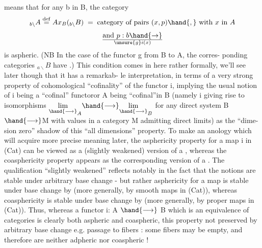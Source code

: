 means that for any b in B, the category
\[ {}_{b\backslash}A \overset{\mathrm{def}}{=} Ax_B({}_{b\backslash}B) \;=\; \text{category of pairs } (x,p)\hand{,} \text{ with } x \text{ in } A \]
\[ \text{and } p : b \hand{\rightarrow} \over{\unsure{g}}{i}(x) \]
is aspheric. (NB In the case of the functor g from B to A, the corres-%
ponding categories ${}_{a\backslash}B$  have \hand{\uline{\textcolor{black}{initial}}} \hand{\uline{\textcolor{black}{objects}}}.) This condition comes in
here rather formally, we'll see later though that it has a   remarkab-%
le interpretation, in terms of a very strong property of cohomological
``cofinality'' of the functor i, implying the usual notion of i being a
``cofinal'' functor\hand{,}or A being ``cofinal''in B (namely i giving rise to
isomorphisms $\underset{\hand{\longrightarrow}}{\lim}_A \hand{\longrightarrow} \underset{\hand{\longrightarrow}}{\lim}_B$ for any  direct system
B $\hand{\longrightarrow}$M with values in a category M admitting direct limits)\hand{,} as the ``dime-%
sion zero'' shadow of this ``all dimensions'' property. To make an anology
which will acquire more precise meaning later, the asphericity property
for a map i in (Cat) can be viewed as a (slightly weakened) version of
a \hand{\uline{\textcolor{black}{proper map with aspheric fibers}}}, whereas the coasphericity property
appears as the corresponding version of a \hand{\uline{\textcolor{black}{smooth map with aspheric fibers}}}.
The qualification ``slightly weakened'' reflects notably in the fact that
the notions   are \hand{\uline{\textcolor{black}{not}}} stable under arbitrary base change -
but rather\hand{,} asphericity for a map is stable under base change by  \hand{\uline{\textcolor{black}{fibra-%
tion functors}}}(more generally, by  smooth maps in (Cat)), whereas
coasphericity is stable under base change by \hand{\uline{\textcolor{black}{cofibration functors}}}
(more generally, by proper maps in (Cat)). Thus, whereas a functor
i: A $\hand{\longrightarrow}$ B which is an equivalence of categories is clearly both aspheric
and coaspheric, this property   not preserved by arbitrary base
change e.g. passage to fibers :  some fibers may be empty, and therefore
are neither adpheric nor coaspheric !


